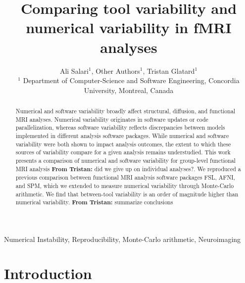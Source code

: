 \documentclass[conference]{IEEEtran}
\begin{document}
\newcommand{\fslspm}{FSL-SPM\xspace}
\newcommand{\fslafni}{FSL-AFNI\xspace}
\newcommand{\afnispm}{AFNI-SPM\xspace}
\newcommand{\tristan}[1]{\color{orange}\textbf{From Tristan:} #1\color{black}\xspace}
\newcommand{\ali}[2]{\color{green}\textbf{Ali:} #1\color{black}\xspace}



\title{Comparing tool variability and numerical variability in fMRI analyses}

\author{Ali Salari$^1$, Other Authors$^1$, Tristan Glatard$^1$ \\
$^1$ Department of Computer-Science and Software Engineering, Concordia University, Montreal, Canada}

\maketitle
\begin{abstract}

Numerical and software variability broadly affect structural, diffusion, and functional MRI analyses. Numerical
variability originates in software updates or code
parallelization, whereas software variability reflects discrepancies between
models implemented in different analysis software packages. While numerical
and software variability were both shown to impact analysis outcomes, the
extent to which these sources of variability compare for a given
analysis remains understudied. This work presents a comparison of
numerical and software variability for group-level functional MRI analysis
\tristan{did we give up on individual analyses?}.
We reproduced a previous comparison between functional MRI analysis
software packages FSL, AFNI, and SPM, which we extended to measure
numerical variability through Monte-Carlo arithmetic.
We find that between-tool variability is an order of magnitude higher than numerical variability.
\tristan{summarize conclusions}

\end{abstract}

\begin{IEEEkeywords}
  Numerical Instability, Reproducibility, Monte-Carlo arithmetic, Neuroimaging
\end{IEEEkeywords}


\section{Introduction}
\end{document}
